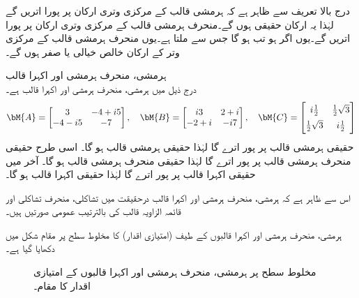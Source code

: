 درج بالا  تعریف سے ظاہر ہے کہ ہرمشی قالب کے مرکزی وتری ارکان  پر پورا اتریں گے  لہٰذا یہ ارکان حقیقی ہوں گے۔منحرف ہرمشی قالب کے مرکزی وتری  ارکان  پر پورا اتریں گے۔یوں اگر  ہو تب   ہو گا جس سے   ملتا ہے۔یوں منحرف ہرمشی قالب کے مرکزی وتر کے ارکان خالص خیالی یا صفر  ہوں گے۔

\quad ہرمشی، منحرف ہرمشی اور اکہرا قالب\\
درج ذیل میں  ہرمشی،  منحرف ہرمشی اور  اکہرا قالب ہے۔
\begin{align*}
\bM{A}=\begin{bmatrix} 3&-4+i5\\-4-i5&-7 \end{bmatrix}, \quad \bM{B}=\begin{bmatrix} i3&2+i\\-2+i&-i7 \end{bmatrix},\quad
\bM{C}=\begin{bmatrix} i\tfrac{1}{2}&\tfrac{1}{2}\sqrt{3}\\[0.5em]\tfrac{1}{2}\sqrt{3}&i\tfrac{1}{2} \end{bmatrix}  
\end{align*}
حقیقی ہرمشی قالب  پر پور اترے گا لہٰذا حقیقی ہرمشی قالب  ہو گا۔ اسی طرح حقیقی منحرف ہرمشی قالب
  پر پور اترے گا لہٰذا حقیقی منحرف ہرمشی قالب  ہو گا۔ آخر میں حقیقی اکہرا  قالب
  پر پور اترے گا لہٰذا حقیقی اکہرا قالب  ہو گا۔ 

اس سے ظاہر ہے کہ  ہرمشی،  منحرف ہرمشی اور اکہرا قالب درحقیقت میں تشاکلی، منحرف تشاکلی اور قائمہ الزاویہ قالب کی بالترتیب عمومی صورتیں ہیں۔

ہرمشی، منحرف ہرمشی اور اکہرا قالبوں کے طیف (امتیازی اقدار) کا مخلوط  سطح پر مقام شکل  میں دکھایا گیا ہے۔
\begin{figure}
\centering
{}
\caption{مخلوط  سطح پر ہرمشی، منحرف ہرمشی اور اکہرا قالبوں کے امتیازی اقدار کا مقام۔}
\label{شکل_امتیازی_مخلوط_سطح_مقام}
\end{figure}

